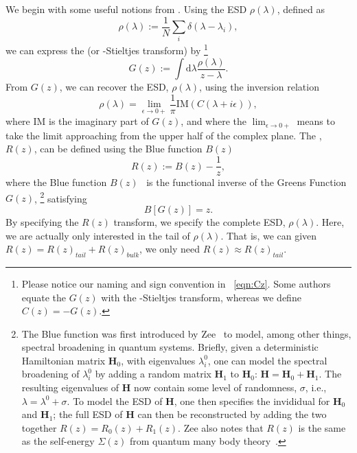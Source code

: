We begin with some useful notions from \RandomMatrixTheory.
%
Using the ESD $\rho(\lambda)$, defined as
\begin{equation}
\label{eqn:rgo}
\rho(\lambda):=\frac{1}{N}\sum_{i}\delta(\lambda-\lambda_{i})  ,
\end{equation}
%
we can express the \emph{\GreensFunction} (or \emph{\Cauchy}-Stieltjes transform) by%
\footnote{Please notice our naming and sign convention in \EQN~\ref{eqn:Cz}.
Some authors equate the \GreensFunction $G(z)$ with
the \Cauchy-Stieltjes transform, whereas we define $C(z)=-G(z)$.}
\begin{equation}
\label{eqn:Gz}
G(z):=\int \mathrm{d}\lambda \frac{\rho(\lambda)}{z-\lambda} .
\end{equation}
%
From $G(z)$, we can recover the ESD, $\rho(\lambda)$, using the inversion relation
\begin{equation}
\label{eqn:GzInverse}
\rho(\lambda)=\lim_{\epsilon\rightarrow 0+}\frac{1}{\pi}\mathrm{IM}(C(\lambda+i\epsilon))  ,
\end{equation}
where $\mathrm{IM}$ is the imaginary part of $G(z)$, and where the $\lim_{\epsilon\rightarrow 0+}$ means to take the limit approaching from the upper half of the complex plane.
%
The \RTransform, $R(z)$, can be defined using the Blue function $B(z)$ 
\begin{equation}
\label{eqn:Rz}
R(z):=B(z)-\frac{1}{z}  ,
\end{equation}
where the Blue function $B(z)$~\cite{Zee1996} is the functional inverse of the Greens Function $G(z)$,%
\footnote{The Blue function was first introduced by Zee~\cite{Zee1996} to model, among other things, spectral broadening in quantum systems.
Briefly, given a deterministic Hamiltonian matrix $\mathbf{H}_{0}$, with eigenvalues $\lambda^{0}_{i}$,
one can model the spectral broadening of $\lambda^{0}_{i}$ by adding a random matrix $\mathbf{H}_{1}$ to $\mathbf{H}_{0}$:
$\mathbf{H}=\mathbf{H}_{0}+\mathbf{H}_{1}$.  
The resulting eigenvalues of $\mathbf{H}$ now contain some level of randomness, $\sigma$, i.e., $\lambda=\lambda^{0}+\sigma$.  
To model the ESD of $\mathbf{H}$, one then specifies the invididual \RTransforms for $\mathbf{H}_{0}$ and $\mathbf{H}_{1}$; the full ESD of $\mathbf{H}$
can then be reconstructed by adding the two \RTransforms together $R(z)=R_{0}(z)+R_{1}(z)$.
Zee also notes that $R(z)$  is the same as the self-energy $\Sigma(z)$ from quantum many body theory~\cite{Zee1996}.}
satisfying 
\begin{equation}
\label{eqn:GzRelation}
B[G(z)]=z  .
\end{equation}
By specifying the $R(z)$ transform, we specify the complete ESD, $\rho(\lambda)$.
Here, we are actually only interested in the tail of $\rho(\lambda)$.
That is, we can given $R(z)=R(z)_{tail}+R(z)_{bulk}$, we only need $R(z)\approx R(z)_{tail}$.

